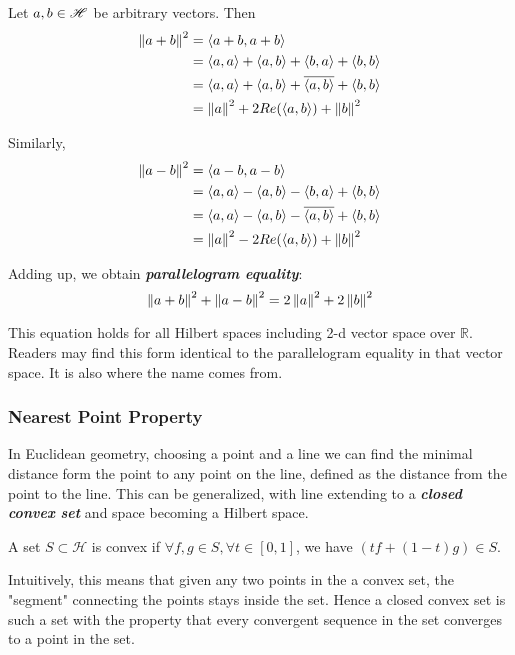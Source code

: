 \documentclass{article}
\begin{document}
\begin{remark}\rm\label{parallelogram}\nextline
	Let $a,b\in \mathscr{H}$ be arbitrary vectors.
	Then
	\begin{equation}
		\begin{split}
			\left\|{a+b}\right\|^2&=\left<{a+b},{a+b}\right>\\
			&=\left<{a},{a}\right>+\left<{a},{b}\right>+\left<{b},{a}\right>+\left<{b},{b}\right>\\
			&=\left<{a},{a}\right>+\left<{a},{b}\right>+{\overline{\left<{a},{b}\right>}}+\left<{b},{b}\right>\\
			&=\left\|{a}\right\|^2+2Re(\left<{a},{b}\right>)+\left\|{b}\right\|^2
		\end{split}
	\end{equation}

	Similarly,
	\begin{equation}
		\begin{split}
			\left\|{a-b}\right\|^2&=\left<{a-b},{a-b}\right>\\
			&=\left<{a},{a}\right>-\left<{a},{b}\right>-\left<{b},{a}\right>+\left<{b},{b}\right>\\
			&=\left<{a},{a}\right>-\left<{a},{b}\right>-{\overline{\left<{a},{b}\right>}}+\left<{b},{b}\right>\\
			&=\left\|{a}\right\|^2-2Re(\left<{a},{b}\right>)+\left\|{b}\right\|^2
		\end{split}
	\end{equation}

	Adding up, we obtain {\bf{\emph{ parallelogram equality}}}:
	$$
		\left\|{a+b}\right\|^2+\left\|{a-b}\right\|^2=2\left\|{a}\right\|^2+2\left\|{b}\right\|^2
	$$


	This equation holds for all Hilbert spaces including 2-d vector space over $\mathbb R$. Readers may find this form identical to the parallelogram equality in that vector space. It is also where the name comes from.
\end{remark}



\subsubsection{Nearest Point Property}
\begin{unexaminable}
In Euclidean geometry, choosing a point and a line we can find the minimal distance form the point to any point on the line, defined as the distance from the point to the line. This can be generalized, with line extending to a {\bf{\emph{closed convex set}}} and space becoming a Hilbert space.
\end{unexaminable}


\begin{definition}[Convexity]\rm\label{convexity}\nextline
	A set $S\subset \mathscr{H}$ is convex if $\forall f,g\in S,\forall t\in\left[0,1\right]$, we have $(tf+(1-t)g)\in S$.

\end{definition}
Intuitively, this means that given any two points in the a convex set, the "segment" connecting the points stays inside the set. Hence a closed convex set is such a set with the property that every convergent sequence in the set converges to a point in the set.
\end{document}
